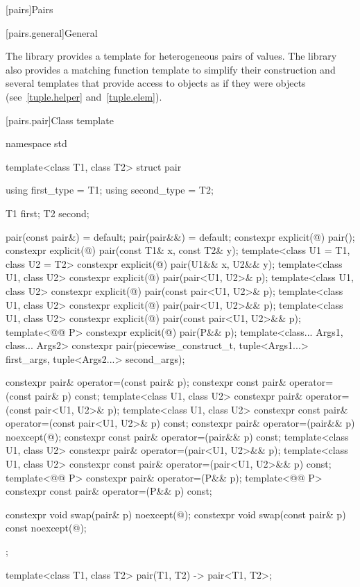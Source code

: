 [pairs]{Pairs}

[pairs.general]{General}

\pnum
The library provides a template for heterogeneous pairs of values.
The library also provides a matching function template to simplify
their construction and several templates that provide access to 
objects as if they were  objects (see~\ref{tuple.helper}
and~\ref{tuple.elem}).%
%
%
%

[pairs.pair]{Class template }

%
\begin{codeblock}
namespace std {
  template<class T1, class T2>
  struct pair {
    using first_type  = T1;
    using second_type = T2;

    T1 first;
    T2 second;

    pair(const pair&) = default;
    pair(pair&&) = default;
    constexpr explicit(@\seebelow@) pair();
    constexpr explicit(@\seebelow@) pair(const T1& x, const T2& y);
    template<class U1 = T1, class U2 = T2>
      constexpr explicit(@\seebelow@) pair(U1&& x, U2&& y);
    template<class U1, class U2>
      constexpr explicit(@\seebelow@) pair(pair<U1, U2>& p);
    template<class U1, class U2>
      constexpr explicit(@\seebelow@) pair(const pair<U1, U2>& p);
    template<class U1, class U2>
      constexpr explicit(@\seebelow@) pair(pair<U1, U2>&& p);
    template<class U1, class U2>
      constexpr explicit(@\seebelow@) pair(const pair<U1, U2>&& p);
    template<@@ P>
      constexpr explicit(@\seebelow@) pair(P&& p);
    template<class... Args1, class... Args2>
      constexpr pair(piecewise_construct_t,
                     tuple<Args1...> first_args, tuple<Args2...> second_args);

    constexpr pair& operator=(const pair& p);
    constexpr const pair& operator=(const pair& p) const;
    template<class U1, class U2>
      constexpr pair& operator=(const pair<U1, U2>& p);
    template<class U1, class U2>
      constexpr const pair& operator=(const pair<U1, U2>& p) const;
    constexpr pair& operator=(pair&& p) noexcept(@\seebelow@);
    constexpr const pair& operator=(pair&& p) const;
    template<class U1, class U2>
      constexpr pair& operator=(pair<U1, U2>&& p);
    template<class U1, class U2>
      constexpr const pair& operator=(pair<U1, U2>&& p) const;
    template<@@ P>
      constexpr pair& operator=(P&& p);
    template<@@ P>
      constexpr const pair& operator=(P&& p) const;

    constexpr void swap(pair& p) noexcept(@\seebelow@);
    constexpr void swap(const pair& p) const noexcept(@\seebelow@);
  };

  template<class T1, class T2>
    pair(T1, T2) -> pair<T1, T2>;
}
\end{codeblock}

